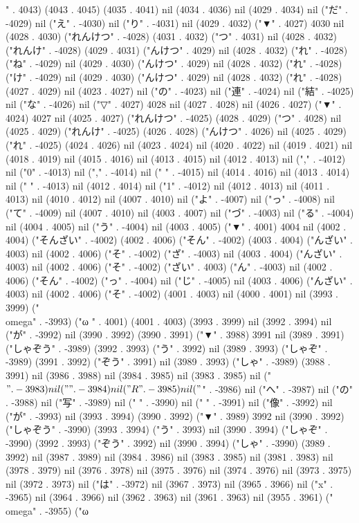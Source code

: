{" . 4043) (4043 . 4045) (4035 . 4041) nil (4034 . 4036) nil (4029 . 4034) nil ("だ" . -4029) nil ("え" . -4030) nil ("り" . -4031) nil (4029 . 4032) ("▼" . 4027) 4030 nil (4028 . 4030) ("れんけつ" . -4028) (4031 . 4032) ("つ" . 4031) nil (4028 . 4032) ("れんけ" . -4028) (4029 . 4031) ("んけつ" . 4029) nil (4028 . 4032) ("れ" . -4028) ("ね" . -4029) nil (4029 . 4030) ("んけつ" . 4029) nil (4028 . 4032) ("れ" . -4028) ("け" . -4029) nil (4029 . 4030) ("んけつ" . 4029) nil (4028 . 4032) ("れ" . -4028) (4027 . 4029) nil (4023 . 4027) nil ("の" . -4023) nil ("連" . -4024) nil ("結" . -4025) nil ("な" . -4026) nil ("▽" . 4027) 4028 nil (4027 . 4028) nil (4026 . 4027) ("▼" . 4024) 4027 nil (4025 . 4027) ("れんけつ" . -4025) (4028 . 4029) ("つ" . 4028) nil (4025 . 4029) ("れんけ" . -4025) (4026 . 4028) ("んけつ" . 4026) nil (4025 . 4029) ("れ" . -4025) (4024 . 4026) nil (4023 . 4024) nil (4020 . 4022) nil (4019 . 4021) nil (4018 . 4019) nil (4015 . 4016) nil (4013 . 4015) nil (4012 . 4013) nil ("," . -4012) nil ("0" . -4013) nil ("," . -4014) nil (" " . -4015) nil (4014 . 4016) nil (4013 . 4014) nil (" " . -4013) nil (4012 . 4014) nil ("1" . -4012) nil (4012 . 4013) nil (4011 . 4013) nil (4010 . 4012) nil (4007 . 4010) nil ("よ" . -4007) nil ("っ" . -4008) nil ("て" . -4009) nil (4007 . 4010) nil (4003 . 4007) nil ("づ" . -4003) nil ("る" . -4004) nil (4004 . 4005) nil ("う" . -4004) nil (4003 . 4005) ("▼" . 4001) 4004 nil (4002 . 4004) ("そんざい" . -4002) (4002 . 4006) ("そん" . -4002) (4003 . 4004) ("んざい" . 4003) nil (4002 . 4006) ("そ" . -4002) ("ざ" . -4003) nil (4003 . 4004) ("んざい" . 4003) nil (4002 . 4006) ("そ" . -4002) ("ざい" . 4003) ("ん" . -4003) nil (4002 . 4006) ("そん" . -4002) ("っ" . -4004) nil ("じ" . -4005) nil (4003 . 4006) ("んざい" . 4003) nil (4002 . 4006) ("そ" . -4002) (4001 . 4003) nil (4000 . 4001) nil (3993 . 3999) ("\\omega" . -3993) ("ω
" . 4001) (4001 . 4003) (3993 . 3999) nil (3992 . 3994) nil ("が" . -3992) nil (3990 . 3992) (3990 . 3991) ("▼" . 3988) 3991 nil (3989 . 3991) ("しゃぞう" . -3989) (3992 . 3993) ("う" . 3992) nil (3989 . 3993) ("しゃぞ" . -3989) (3991 . 3992) ("ぞう" . 3991) nil (3989 . 3993) ("しゃ" . -3989) (3988 . 3991) nil (3986 . 3988) nil (3984 . 3985) nil (3983 . 3985) nil ("$" . -3983) nil ("\\" . -3984) nil ("R" . -3985) nil ("$" . -3986) nil ("へ" . -3987) nil ("の" . -3988) nil ("写" . -3989) nil ("
" . -3990) nil (" " . -3991) nil ("像" . -3992) nil ("が" . -3993) nil (3993 . 3994) (3990 . 3992) ("▼" . 3989) 3992 nil (3990 . 3992) ("しゃぞう" . -3990) (3993 . 3994) ("う" . 3993) nil (3990 . 3994) ("しゃぞ" . -3990) (3992 . 3993) ("ぞう" . 3992) nil (3990 . 3994) ("しゃ" . -3990) (3989 . 3992) nil (3987 . 3989) nil (3984 . 3986) nil (3983 . 3985) nil (3981 . 3983) nil (3978 . 3979) nil (3976 . 3978) nil (3975 . 3976) nil (3974 . 3976) nil (3973 . 3975) nil (3972 . 3973) nil ("は" . -3972) nil (3967 . 3973) nil (3965 . 3966) nil ("x" . -3965) nil (3964 . 3966) nil (3962 . 3963) nil (3961 . 3963) nil (3955 . 3961) ("\\omega" . -3955) ("ω
}
